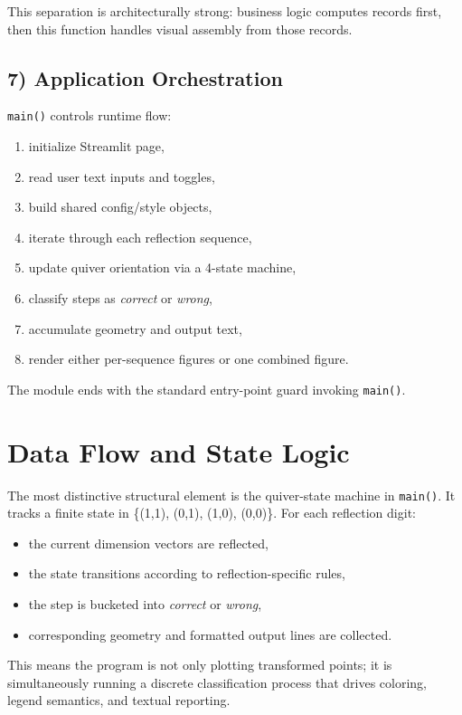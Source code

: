 \documentclass[11pt,a4paper]{article}
\begin{document}
This separation is architecturally strong: business logic computes records first, then this function handles visual assembly from those records.

\subsection*{7) Application Orchestration}
\texttt{main()} controls runtime flow:

\begin{enumerate}
    \item initialize Streamlit page,
    \item read user text inputs and toggles,
    \item build shared config/style objects,
    \item iterate through each reflection sequence,
    \item update quiver orientation via a 4-state machine,
    \item classify steps as \emph{correct} or \emph{wrong},
    \item accumulate geometry and output text,
    \item render either per-sequence figures or one combined figure.
\end{enumerate}

The module ends with the standard entry-point guard invoking \texttt{main()}.

\section*{Data Flow and State Logic}
The most distinctive structural element is the quiver-state machine in \texttt{main()}. It tracks a finite state in \{(1,1), (0,1), (1,0), (0,0)\}. For each reflection digit:

\begin{itemize}
    \item the current dimension vectors are reflected,
    \item the state transitions according to reflection-specific rules,
    \item the step is bucketed into \emph{correct} or \emph{wrong},
    \item corresponding geometry and formatted output lines are collected.
\end{itemize}

This means the program is not only plotting transformed points; it is simultaneously running a discrete classification process that drives coloring, legend semantics, and textual reporting.
\end{document}
